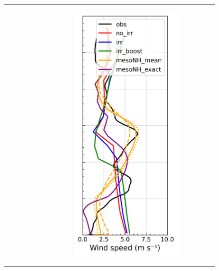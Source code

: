 \begin{figure}[hbtp]
{\begin{tabular}{@{}cccc@{}}
\begin{subfigure}[t]{0.283\textwidth}
        \end{subfigure} &
        \begin{subfigure}[t]{0.283\textwidth}
            \caption{}
            \includegraphics[width=\textwidth]{images/chap5/profiles/profile_cendrosa_wind_speed_2007_sensbins.png}

\end{subfigure}
\end{tabular}}
\end{figure}
